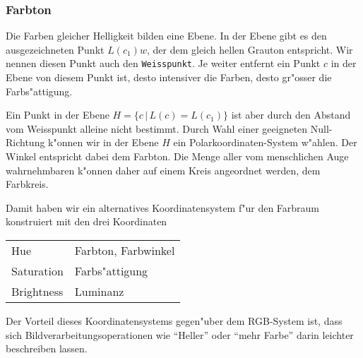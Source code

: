\subsubsection{Farbton}
Die Farben gleicher Helligkeit bilden eine Ebene. In der Ebene gibt es
den ausgezeichneten Punkt $L(c_1)w$, der dem gleich hellen Grauton
entspricht. Wir nennen diesen Punkt auch den {\tt Weisspunkt}.
Je weiter entfernt ein Punkt $c$ in der Ebene von diesem
Punkt ist, desto intensiver die Farben, desto gr"osser die Farbs"attigung.

Ein Punkt in der Ebene $H=\{c\,|\, L(c)=L(c_1)\}$ ist aber durch
den Abstand vom Weisspunkt alleine nicht bestimmt. Durch Wahl einer 
geeigneten Null-Richtung k"onnen wir in der Ebene $H$ ein
Polarkoordinaten-System w"ahlen. Der Winkel entspricht dabei dem
Farbton.
Die Menge aller vom menschlichen Auge wahrnehmbaren k"onnen daher
auf einem Kreis angeordnet werden, dem Farbkreis.

Damit haben wir ein alternatives Koordinatensystem f"ur den Farbraum
konstruiert mit den drei Koordinaten
\begin{center}
\begin{tabular}{l|l}
\hline
Hue&Farbton, Farbwinkel\\
Saturation&Farbs"attigung\\
Brightness&Luminanz\\
\hline
\end{tabular}
\end{center}
Der Vorteil dieses Koordinatensystems gegen"uber dem RGB-System ist,
dass sich Bildverarbeitungsoperationen wie ``Heller'' oder ``mehr Farbe''
darin leichter beschreiben lassen.
